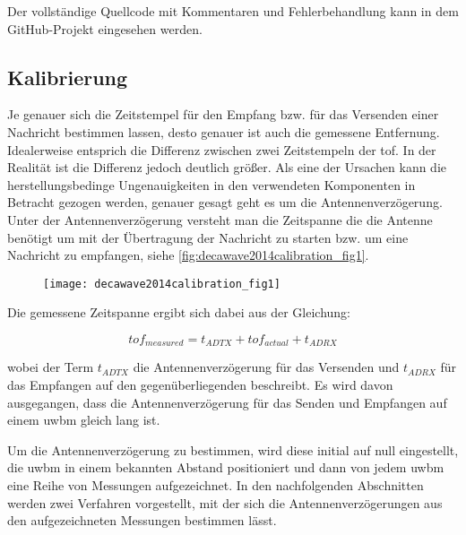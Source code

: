 Der vollständige Quellcode mit Kommentaren und Fehlerbehandlung kann in dem GitHub-Projekt \cite{kasdorf2017roslamwithuwb} eingesehen werden.


%
%
%
\subsection{Kalibrierung}

Je genauer sich die Zeitstempel für den Empfang bzw. für das Versenden einer Nachricht bestimmen lassen, desto genauer ist auch die gemessene Entfernung. Idealerweise entsprich die Differenz zwischen zwei Zeitstempeln der \Gls{tof}. In der Realität ist die Differenz jedoch deutlich größer. Als eine der Ursachen kann die herstellungsbedinge Ungenauigkeiten in den verwendeten Komponenten in Betracht gezogen werden, genauer gesagt geht es um die Antennenverzögerung. Unter der Antennenverzögerung versteht man die Zeitspanne die die Antenne benötigt um mit der Übertragung der Nachricht zu starten bzw. um eine Nachricht zu empfangen, siehe  \autoref{fig:decawave2014calibration_fig1}.

\begin{figure}[h]
	\centering
	\texttt{[image: decawave2014calibration\_fig1]}
	\label{fig:decawave2014calibration_fig1}
\end{figure}

Die gemessene Zeitspanne ergibt sich dabei aus der Gleichung: 

\begin{equation}
tof_{measured}=t_{ADTX}+tof_{actual}+t_{ADRX}\label{eq:antenna_delay_1}
\end{equation}

wobei der Term $t_{ADTX}$ die Antennenverzögerung für das Versenden und $t_{ADRX}$ für das Empfangen auf den gegenüberliegenden  beschreibt. Es wird davon ausgegangen, dass die Antennenverzögerung für das Senden und Empfangen auf einem \Gls{uwbm} gleich lang ist. \cite{decawave2016dw1kusermanual}

Um die Antennenverzögerung zu bestimmen, wird diese initial auf null eingestellt, die \Gls{uwbm} in einem bekannten Abstand positioniert und dann von jedem \Gls{uwbm} eine Reihe von Messungen aufgezeichnet. In den nachfolgenden Abschnitten werden zwei Verfahren vorgestellt, mit der sich die Antennenverzögerungen aus den aufgezeichneten Messungen bestimmen lässt.



